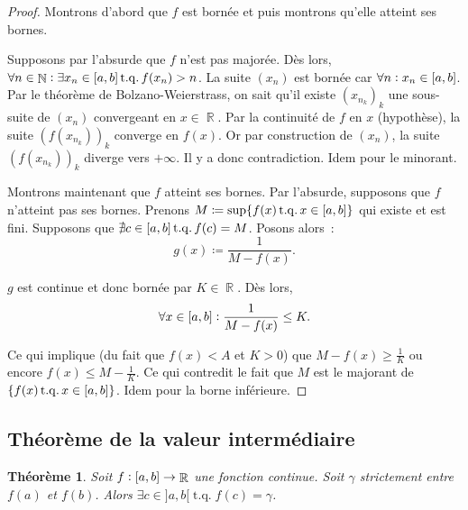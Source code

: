 \documentclass{article}
\DeclareMathOperator{\N}{\mathbb N}
\DeclareMathOperator{\R}{\mathbb R}
\DeclareMathOperator{\tq}{ t.q. }
\newcommand{\ab}{\interval ab}
\newcommand{\fabr}[1]{#1 : \ab \to \R}
\newtheorem{thm}{Théorème}[section]
\theoremstyle{definition}
\theoremstyle{remark}
\begin{document}
		\begin{proof} Montrons d'abord que $f$ est bornée et puis montrons qu'elle atteint ses bornes.

		Supposons par l'absurde que $f$ n'est pas majorée. Dès lors, $\forall n \in \N : \exists x_n \in \ab \tq f(x_n) > n$. La suite $(x_n)$ est bornée car
		$\forall n : x_n \in \ab$. Par le théorème de Bolzano-Weierstrass, on sait qu'il existe $(x_{n_k})_k$ une sous-suite de $(x_n)$ convergeant en
		$x \in \R$. Par la continuité de $f$ en $x$ (hypothèse), la suite $(f(x_{n_k}))_k$ converge en $f(x)$. Or par construction de $(x_n)$, la suite $(f(x_{n_k}))_k$
		diverge vers $+\infty$. Il y a donc contradiction. Idem pour le minorant.

		Montrons maintenant que $f$ atteint ses bornes. Par l'absurde, supposons que $f$ n'atteint pas ses bornes. Prenons
		$M \coloneqq \sup\{f(x) \tq x \in \ab\}$ qui existe et est fini. Supposons que $\nexists c \in \ab \tq f(c) = M$. Posons alors~:
		\[g(x) \coloneqq \frac 1{M - f(x)}.\]

		$g$ est continue et donc bornée par $K \in \R$. Dès lors,
		\[\forall x \in \ab : \frac 1{M-f(x)} \leq K.\]

		Ce qui implique (du fait que $f(x) < A$ et $K > 0$) que $M-f(x) \geq \frac 1K$ ou encore $f(x) \leq M - \frac 1K$. Ce qui contredit le fait que $M$ est le
		majorant de $\{f(x) \tq x \in \ab\}$. Idem pour la borne inférieure. \end{proof}

	\subsection{Théorème de la valeur intermédiaire}

		\begin{thm} Soit $\fabr f$ une fonction continue. Soit $\gamma$ strictement entre $f(a)$ et $f(b)$.
		Alors $\exists c \in ]a, b[ \tq f(c) = \gamma$. \end{thm}
\end{document}
